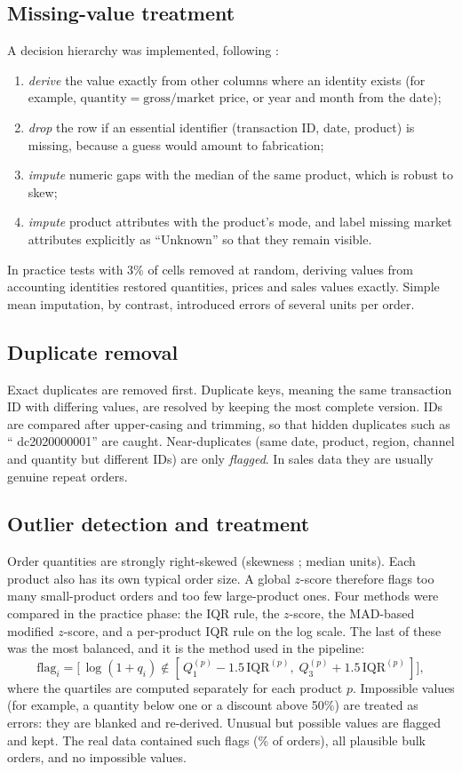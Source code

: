 \subsection{Missing-value treatment}
A decision hierarchy was implemented, following \citet{garcia2015}:
\begin{enumerate}
  \item \emph{derive} the value exactly from other columns where an identity exists (for example,
        $\text{quantity} = \text{gross}/\text{market price}$, or year and month from the date);
  \item \emph{drop} the row if an essential identifier (transaction ID, date, product) is missing, because a
        guess would amount to fabrication;
  \item \emph{impute} numeric gaps with the median of the same product, which is robust to skew;
  \item \emph{impute} product attributes with the product's mode, and label missing market attributes
        explicitly as ``Unknown'' so that they remain visible.
\end{enumerate}
In practice tests with 3\% of cells removed at random, deriving values from accounting identities restored
quantities, prices and sales values exactly. Simple mean imputation, by contrast, introduced errors of several
units per order.

\subsection{Duplicate removal}
Exact duplicates are removed first. Duplicate keys, meaning the same transaction ID with differing values, are
resolved by keeping the most complete version. IDs are compared after upper-casing and trimming, so that hidden
duplicates such as `` dc2020000001'' are caught. Near-duplicates (same date, product, region, channel and
quantity but different IDs) are only \emph{flagged}. In sales data they are usually genuine repeat orders.

\subsection{Outlier detection and treatment}
Order quantities are strongly right-skewed (skewness \QtySkew; median \QtyMedian units). Each product also has
its own typical order size. A global $z$-score therefore flags too many small-product orders and too few
large-product ones. Four methods were compared in the practice phase: the IQR rule, the $z$-score, the MAD-based
modified $z$-score, and a per-product IQR rule on the log scale. The last of these was the most balanced, and
it is the method used in the pipeline:
\[
  \text{flag}_i = \bigl[\, \log(1+q_i) \notin [\,Q_1^{(p)} - 1.5\,\text{IQR}^{(p)},\; Q_3^{(p)} + 1.5\,\text{IQR}^{(p)}\,] \bigr],
\]
where the quartiles are computed separately for each product $p$. Impossible values (for example, a quantity
below one or a discount above 50\%) are treated as errors: they are blanked and re-derived. Unusual but possible
values are flagged and kept. The real data contained \NOutlierFlags such flags (\OutlierPct\% of orders), all
plausible bulk orders, and no impossible values.

